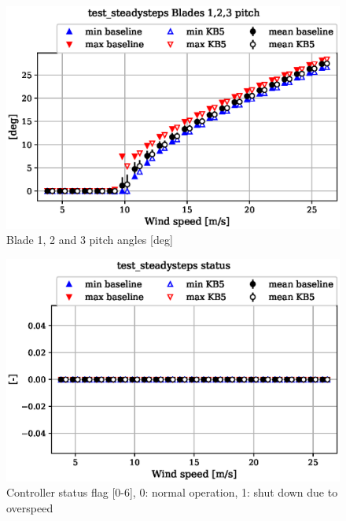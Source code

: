 \begin{figure}[!ht]
\begin{center}
	\includegraphics[width=.85\linewidth]{figures/baseline-vs-KB6/test_steadysteps/bearing-pitch1-angle-deg_AA0008_AA0008.eps}
\end{center}
\caption{Blade 1, 2 and 3 pitch angles [deg]}
\label{fig:baseline-vs-KB6:test_steadysteps:pitch}
\end{figure}

\begin{figure}[!ht]
\begin{center}
	\includegraphics[width=.85\linewidth]{figures/baseline-vs-KB6/test_steadysteps/DLL-dtu_we_controller-inpvec-22_AA0008_AA0008.eps}
\end{center}
\caption{Controller status flag [0-6], 0: normal operation, 1: shut down due to overspeed}
\label{fig:baseline-vs-KB6:test_steadysteps:status}
\end{figure}

